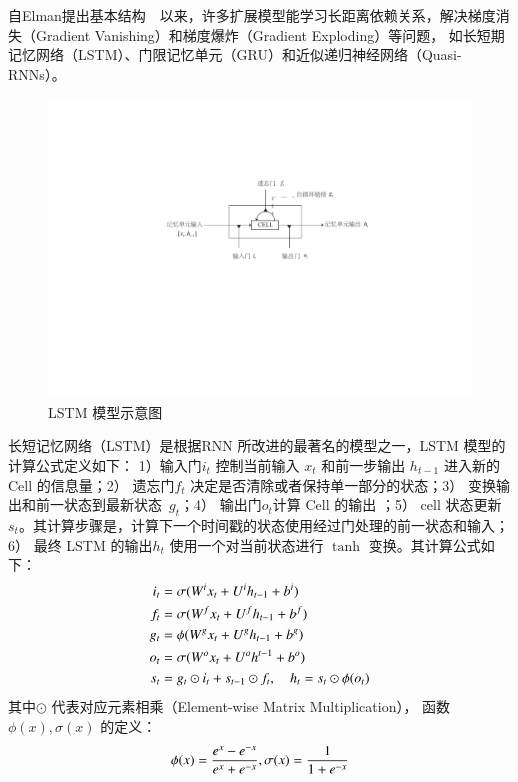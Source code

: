 自Elman提出基本结构~~以来，许多扩展模型能学习长距离依赖关系，解决梯度消失（Gradient Vanishing）和梯度爆炸（Gradient Exploding）等问题， 如长短期记忆网络（LSTM）、门限记忆单元（GRU）和近似递归神经网络（Quasi-RNNs）。

\begin{figure}[!b]
  \centering
  \includegraphics[width=.8\linewidth]{./figures/lstm.pdf}
  \caption{LSTM 模型示意图}\label{fig:lstm}
\end{figure}

长短记忆网络（LSTM）是根据RNN 所改进的最著名的模型之一，LSTM 模型的计算公式定义如下： 1）输入门$i_t$ 控制当前输入 $x_t$ 和前一步输出 $h_{t−1}$ 进入新的 Cell 的信息量；2） 遗忘门$f_t$ 决定是否清除或者保持单一部分的状态；3） 变换输出和前一状态到最新状态~$g_t$；4） 输出门$o_t$计算 Cell 的输出 ；5） cell 状态更新$s_t$。其计算步骤是，计算下一个时间戳的状态使用经过门处理的前一状态和输入；6） 最终 LSTM 的输出$h_t$ 使用一个对当前状态进行 $\tanh$ 变换。其计算公式如下：
\begin{equation}\label{equ:lstm}
\setlength{\abovedisplayskip}{6pt}
\setlength{\belowdisplayskip}{6pt}
\begin{split}
   i_t&=\sigma(W^i x_t+U^i h_{t-1}+b^i) \\
   f_t&=\sigma(W^f x_t+U^f h_{t-1}+b^f) \\
   g_t&=\phi(W^g x_t+U^g h_{t-1}+b^g) \\
   o_t&=\sigma(W^o x_t+U^o h^{t-1}+b^o) \\
   s_t&=g_t\odot i_t+s_{t-1}\odot f_t,\quad h_t=s_t\odot \phi(o_t)
\end{split}
\end{equation}
其中$\odot$ 代表对应元素相乘（Element-wise Matrix Multiplication）， 函数 $\phi(x), \sigma(x)$ 的定义：
\begin{equation}\label{equ:tanh}
\setlength{\abovedisplayskip}{6pt}
\setlength{\belowdisplayskip}{6pt}
  \phi(x)=\frac{e^x-e^{-x}}{e^x+e^{-x}},\sigma(x)=\frac{1}{1+e^{-x}}
\end{equation}

